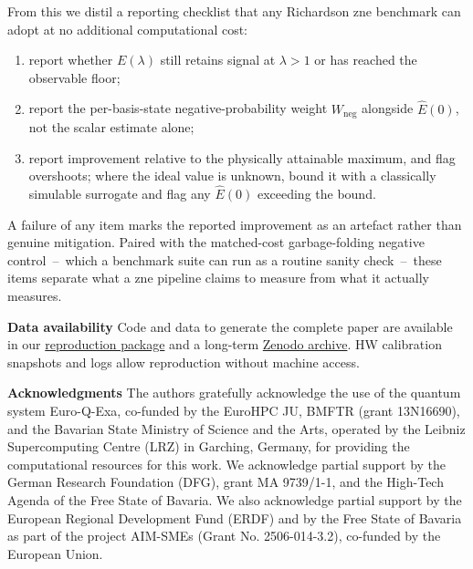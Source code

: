 \documentclass[10pt,conference, letterpaper]{IEEEtran}
\newcommand{\repro}{\href{https://github.com/lfd/qce26_artefactual_improvements_zne}{reproduction package\xspace}}
\newcommand{\zenodo}{\href{https://doi.org/10.5281/zenodo.21540565}{Zenodo archive\xspace}}
\begin{document}
From this we distil a reporting checklist that any Richardson \gls{zne} benchmark can adopt at no additional computational cost:
\begin{enumerate}[label=(\arabic*),noitemsep,topsep=2pt,leftmargin=1.8em]
  \item report whether $E(\lambda)$ still retains signal at $\lambda>1$ or has reached the observable floor;
  \item report the per-basis-state negative-probability weight $W_\text{neg}$ alongside $\hat{E}(0)$, not the scalar estimate alone;
  \item report improvement relative to the physically attainable maximum, and flag overshoots; where the ideal value is unknown, bound it with a classically simulable surrogate and flag any $\hat{E}(0)$ exceeding the bound.
\end{enumerate}
A failure of any item marks the reported improvement as an artefact rather than genuine mitigation. Paired with the matched-cost garbage-folding negative control~--~which a benchmark suite can run as a routine sanity check~--~these items separate what a \gls{zne} pipeline claims to measure from what it actually measures.



\begin{small}
\textbf{Data availability} Code and data to generate the complete paper are available in our \repro{} and a long-term \zenodo{}. HW calibration snapshots and logs allow reproduction without machine access.

\textbf{Acknowledgments}
The authors gratefully acknowledge the use of the quantum system Euro-Q-Exa, co-funded by the EuroHPC JU, BMFTR (grant 13N16690), and the Bavarian State Ministry of Science and the Arts, operated by the Leibniz Supercomputing Centre (LRZ) in Garching, Germany, for providing the computational resources for this work. We acknowledge partial support by the German Research Foundation (DFG), grant MA 9739/1-1, and the High-Tech Agenda of the Free State of Bavaria. We also acknowledge partial support by the European Regional Development Fund (ERDF) and by the Free State of Bavaria as part of the project AIM-SMEs (Grant No. 2506-014-3.2), co-funded by the European Union. 
\end{small}

\printbibliography
 
\end{document}
